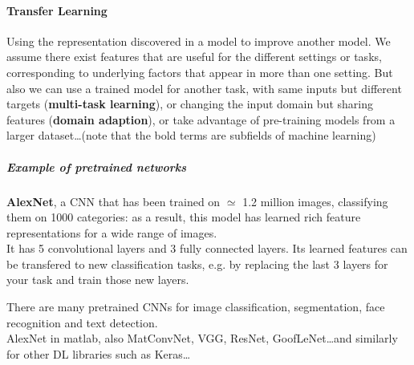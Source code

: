 \documentclass[10pt]{report}
\begin{document}
\paragraph{Transfer Learning} Using the representation discovered in a model to improve another model. We assume there exist features that are useful for the different settings or tasks, corresponding to underlying factors that appear in more than one setting. But also we can use a trained model for another task, with same inputs but different targets (\textbf{multi-task learning}), or changing the input domain but sharing features (\textbf{domain adaption}), or take advantage of pre-training models from a larger dataset\ldots (note that the bold terms are subfields of machine learning)
\subparagraph{Example of pretrained networks}
\begin{list}{}{}
	\item \textbf{AlexNet}, a CNN that has been trained on $\simeq$ 1.2 million images, classifying them on 1000 categories: as a result, this model has learned rich feature representations for a wide range of images.\\
	It has 5 convolutional layers and 3 fully connected layers. Its learned features can be transfered to new classification tasks, e.g. by replacing the last 3 layers for your task and train those new layers.
	\item There are many pretrained CNNs for image classification, segmentation, face recognition and text detection.\\
	AlexNet in matlab, also MatConvNet, VGG, ResNet, GoofLeNet\ldots and similarly for other DL libraries such as Keras\ldots
\end{list}
\end{document}
